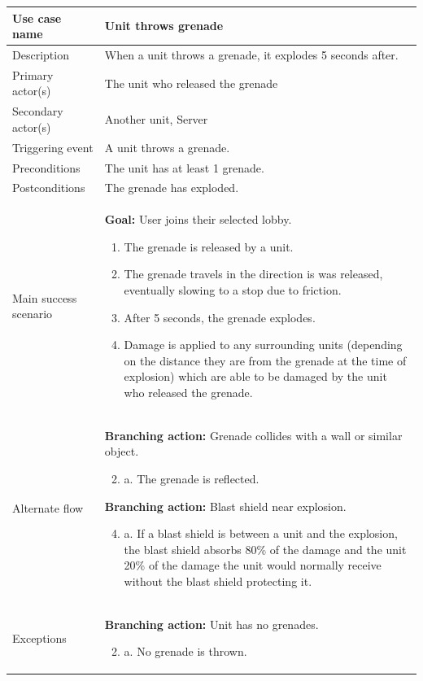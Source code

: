 \documentclass[12pt]{article}
\begin{document}
$$$$
\begin{tabularx}{\textwidth}{|l|X|} \hline
Use case name & \textbf{Unit throws grenade}\\ \hline
Description & When a unit throws a grenade, it explodes 5 seconds after. \\ \hline
Primary actor(s) & The unit who released the grenade\\ \hline
Secondary actor(s) & Another unit, Server \\ \hline
Triggering event & A unit throws a grenade. \\ \hline
Preconditions & The unit has at least 1 grenade. \\ \hline
Postconditions & The grenade has exploded. \\ \hline
Main success scenario & 
\textbf{Goal:} User joins their selected lobby.
\begin{enumerate}[noitemsep,topsep=0px]
	\item The grenade is released by a unit.
	\item The grenade travels in the direction is was released, eventually slowing to a stop due to friction. 
	\item After 5 seconds, the grenade explodes.
	\item Damage is applied to any surrounding units (depending on the distance they are from the grenade at the time of explosion) which are able to be damaged by the unit who released the grenade.
\end{enumerate} \\ \hline
Alternate flow & 
\textbf{Branching action:} Grenade collides with a wall or similar object. 
\begin{enumerate}[noitemsep,topsep=0px,label={\arabic*}]
	\setcounter{enumi}{1} %
	\item a. The grenade is reflected.
\end{enumerate}
\textbf{Branching action:} Blast shield near explosion. 
\begin{enumerate}[noitemsep,topsep=0px,label={\arabic*}]
	\setcounter{enumi}{3} %
	\item a. If a blast shield is between a unit and the explosion, the blast shield absorbs 80\% of the damage and the unit 20\% of the damage the unit would normally receive without the blast shield protecting it.
\end{enumerate}
\\ \hline
Exceptions &  
\textbf{Branching action:} Unit has no grenades. 
\begin{enumerate}[noitemsep,topsep=0px,label={\arabic*}]
	\setcounter{enumi}{1} %
	\item a. No grenade is thrown.
\end{enumerate} \\ \hline
\end{tabularx}
\newpage
\end{document}
